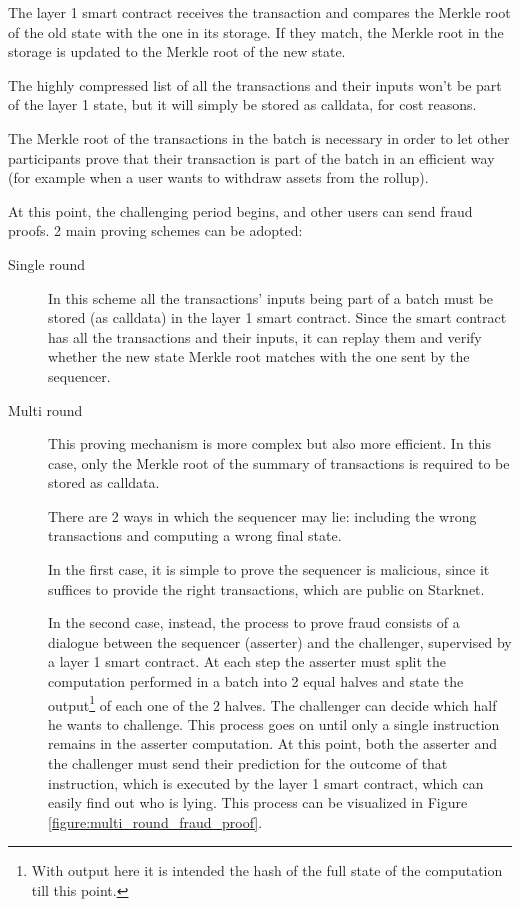 \documentclass[12pt]{article}
\begin{document}
The layer 1 smart contract receives the transaction and compares the Merkle root of the old state with the one in its storage. If they match, the Merkle root in the storage is updated to the Merkle root of the new state.

The highly compressed list of all the transactions and their inputs won't be part of the layer 1 state, but it will simply be stored as calldata, for cost reasons.

The Merkle root of the transactions in the batch is necessary in order to let other participants prove that their transaction is part of the batch in an efficient way (for example when a user wants to withdraw assets from the rollup).

At this point, the challenging period begins, and other users can send fraud proofs. 2 main proving schemes can be adopted:
\begin{description}
    \item[Single round] In this scheme all the transactions' inputs being part of a batch must be stored (as calldata) in the layer 1 smart contract. Since the smart contract has all the transactions and their inputs, it can replay them and verify whether the new state Merkle root matches with the one sent by the sequencer.
    \item[Multi round] This proving mechanism is more complex but also more efficient. In this case, only the Merkle root of the summary of transactions is required to be stored as calldata.
                        
                        There are 2 ways in which the sequencer may lie: including the wrong transactions and computing a wrong final state.
                        
                        In the first case, it is simple to prove the sequencer is malicious, since it suffices to provide the right transactions, which are public on Starknet.

                        In the second case, instead, the process to prove fraud consists of a dialogue between the sequencer (asserter) and the challenger, supervised by a layer 1 smart contract. 
                        At each step the asserter must split the computation performed in a batch into 2 equal halves and state the output\footnote{With output here it is intended the hash of the full state of the computation till this point.} of each one of the 2 halves. 
                        The challenger can decide which half he wants to challenge.
                        This process goes on until only a single instruction remains in the asserter computation. At this point, both the asserter and the challenger must send their prediction for the outcome of that instruction, which is executed by the layer 1 smart contract, which can easily find out who is lying. This process can be visualized in Figure \ref{figure:multi_round_fraud_proof}.
                        \end{description}
\end{document}
